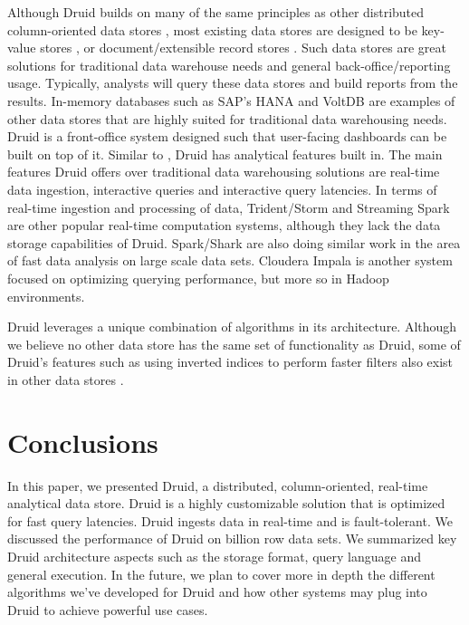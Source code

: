 \documentclass{vldb}
\begin{document}
Although Druid builds on many of the same principles as other
distributed column-oriented data stores \cite{fink2012distributed}, most existing data
stores are designed to be key-value stores \cite{lerner2010redis}, or
document/extensible record stores \cite{stonebraker2005c}. Such data stores are great
solutions for traditional data warehouse needs and general
back-office/reporting usage. Typically, analysts will query these data
stores and build reports from the results. In-memory databases such as
SAP’s HANA \cite{farber2012sap} and VoltDB \cite{voltdb2010voltdb} are examples of other data stores that
are highly suited for traditional data warehousing needs. Druid is a
front-office system designed such that user-facing dashboards can be
built on top of it. Similar to \cite{paraccel2013}, Druid has analytical features
built in. The main features Druid offers over traditional data
warehousing solutions are real-time data ingestion, interactive
queries and interactive query latencies. In terms of real-time
ingestion and processing of data, Trident/Storm \cite{marz2013storm} and Streaming
Spark \cite{zaharia2012discretized} are other popular real-time computation systems, although
they lack the data storage capabilities of Druid. Spark/Shark \cite{engle2012shark} are
also doing similar work in the area of fast data analysis on large
scale data sets. Cloudera Impala \cite{cloudera2013} is another system focused on
optimizing querying performance, but more so in Hadoop environments.

Druid leverages a unique combination of algorithms in its
architecture. Although we believe no other data store has the same set
of functionality as Druid, some of Druid’s features such as using
inverted indices to perform faster filters also exist in other data
stores \cite{macnicol2004sybase}.

\section{Conclusions}
\label{sec:conclusions}
In this paper, we presented Druid, a distributed, column-oriented,
real-time analytical data store. Druid is a highly customizable
solution that is optimized for fast query latencies. Druid ingests
data in real-time and is fault-tolerant. We discussed the performance
of Druid on billion row data sets. We summarized key Druid architecture
aspects such as the storage format, query language and general
execution. In the future, we plan to cover more in depth the different
algorithms we’ve developed for Druid and how other systems may plug
into Druid to achieve powerful use cases.
\end{document}
